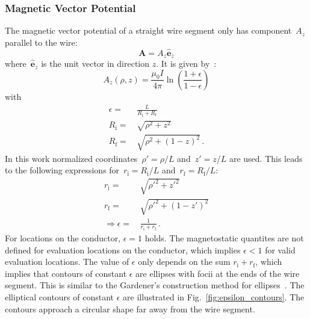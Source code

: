 \subsubsection{Magnetic Vector Potential}
The magnetic vector potential of a straight wire segment
only has component~$A_z$ parallel to the wire:
\begin{equation}
 \mathbf{A} = A_z \hat{\mathbf{e}}_z
\end{equation}
where~$\hat{\mathbf{e}}_z$ is the unit vector in direction $z$.
It is given by~\cite{hanson_hirshman_2002}:
\begin{equation}
  A_z(\rho, z) = \frac{\mu_0 I}{4 \pi} \ln \left( \frac{1 + \epsilon}{1 - \epsilon} \right)
\end{equation}
with
\begin{align}
  \epsilon =&\, \frac{L}{R_\mathrm{i} + R_\mathrm{f}} \\
       R_\mathrm{i} =&\, \sqrt{\rho^2 + z^2} \\
       R_\mathrm{f} =&\, \sqrt{\rho^2 + (1 - z)^2} \, .
\end{align}
In this work normalized coordinates~$\rho' = \rho/L$ and~$z' = z/L$ are used.
This leads to the following expressions
for~$r_\mathrm{i} = R_\mathrm{i}/L$ and~$r_\mathrm{f} = R_\mathrm{f}/L$:
\begin{align}
  r_\mathrm{i} =&\, \sqrt{{\rho'}^2 +      {z'}^2 }       \label{eqn:r_i_default} \\
  r_\mathrm{f} =&\, \sqrt{{\rho'}^2 + (1 - {z'})^2}       \label{eqn:r_f_default} \\
  \Rightarrow
  \epsilon     =&\, \frac{1}{r_\mathrm{i} + r_\mathrm{f}} \label{eqn:eps_default}\, .
\end{align}
For locations on the conductor, $\epsilon = 1$ holds.
The magnetostatic quantites are not defined for evaluation locations on the conductor,
which implies $\epsilon < 1$ for valid evaluation locations.
The value of $\epsilon$ only depends on the sum $r_\mathrm{i} + r_\mathrm{f}$,
which implies that contours of constant $\epsilon$ are ellipses with focii at the ends of the wire segment.
This is similar to the Gardener's construction method for ellipses~\cite{dawson_2021}.
The elliptical contours of constant $\epsilon$ are illustrated in Fig.~\ref{fig:epsilon_contours}.
The contours approach a circular shape far away from the wire segment.
